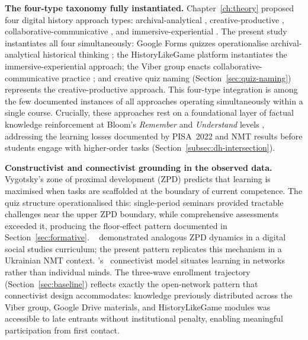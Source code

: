 \textbf{The four-type taxonomy fully instantiated.}
Chapter~\ref{ch:theory} proposed four digital history approach types: archival-analytical \cite{CohenRosenzweig2006, Crymble2021}, creative-productive \cite{guiliano}, collaborative-communicative \cite{Siemens2004, Wright-Maley2018}, and immersive-experiential \cite{Connolly2012, Qian2016, Prensky2001}. The present study instantiates all four simultaneously: Google Forms quizzes operationalise archival-analytical historical thinking \cite{Wineburg2001, Seixas2013}; the HistoryLikeGame platform instantiates the immersive-experiential approach; the Viber group enacts collaborative-communicative practice \cite{Siemens2004}; and creative quiz naming (Section~\ref{sec:quiz-naming}) represents the creative-productive approach. This four-type integration is among the few documented instances of all approaches operating simultaneously within a single course. Crucially, these approaches rest on a foundational layer of factual knowledge reinforcement at Bloom's \textit{Remember} and \textit{Understand} levels \cite{Anderson2001}, addressing the learning losses documented by PISA~2022 \cite{OECDPISA2023} and NMT results \cite{UCEQA2024, UCEQA2025} before students engage with higher-order tasks (Section~\ref{subsec:dh-intersection}).

\textbf{Constructivist and connectivist grounding in the observed data.}
Vygotsky's zone of proximal development (ZPD) \cite{Vygotsky1978} predicts that learning is maximised when tasks are scaffolded at the boundary of current competence. The quiz structure operationalised this: single-period seminars provided tractable challenges near the upper ZPD boundary, while comprehensive assessments exceeded it, producing the floor-effect pattern documented in Section~\ref{sec:formative}. \citeauthor{Tilak2023}~\cite{Tilak2023} demonstrated analogous ZPD dynamics in a digital social studies curriculum; the present pattern replicates this mechanism in a Ukrainian NMT context.
\citeauthor{Siemens2004}'s~\cite{Siemens2004} connectivist model situates learning in networks rather than individual minds. The three-wave enrollment trajectory (Section~\ref{sec:baseline}) reflects exactly the open-network pattern that connectivist design
accommodates: knowledge previously distributed across the Viber group, Google Drive
materials, and HistoryLikeGame modules was accessible to late entrants without
institutional penalty, enabling meaningful participation from first contact.

